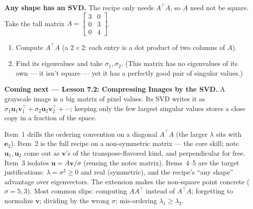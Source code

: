 \documentclass[10pt]{article}
\newcommand{\uu}{\mathbf{u}}
\newcommand{\vv}{\mathbf{v}}
\newcommand{\ee}{\mathbf{e}}
\newcommand{\T}{^{\top}}
\begin{document}
\begin{extensionbox}
\textbf{Any shape has an SVD.} The recipe only needs $A\T A$, so $A$ need not be square. Take the tall
matrix $A=\begin{bmatrix} 3 & 0 \\ 0 & 3 \\ 0 & 4 \end{bmatrix}$.
\begin{enumerate}[label=(\alph*), leftmargin=1.8em, itemsep=5pt]
  \item Compute $A\T A$ (a $2\times2$: each entry is a dot product of two columns of $A$).
  \item Find its eigenvalues and take $\sigma_1,\sigma_2$. (This matrix has no eigenvalues of its own ---
        it isn't square --- yet it has a perfectly good pair of singular values.)
\end{enumerate}
\ansline{(a) Columns $\begin{bsmallmatrix} 3\\0\\0 \end{bsmallmatrix},\begin{bsmallmatrix} 0\\3\\4 \end{bsmallmatrix}$: $A\T A=\begin{bsmallmatrix} 9 & 0\\ 0 & 25 \end{bsmallmatrix}$.}
\end{extensionbox}

\begin{spiralbox}
\textbf{Coming next --- Lesson 7.2: Compressing Images by the SVD.} A grayscale image is a big matrix of
pixel values. Its SVD writes it as $\sigma_1\uu_1\vv_1\T+\sigma_2\uu_2\vv_2\T+\cdots$; keeping only the
few largest singular values stores a close copy in a fraction of the space.
\end{spiralbox}

\begin{teachernote}
Item~1 drills the ordering convention on a diagonal $A\T A$ (the larger $\lambda$ sits with $\ee_2$).
Item~2 is the full recipe on a non-symmetric matrix --- the core skill; note $\uu_1,\uu_2$ come out as
$\vv$'s of the transpose-flavored kind, and perpendicular for free. Item~3 isolates $\uu=A\vv/\sigma$
(reusing the notes matrix). Items~4--5 are the target justifications: $\lambda=\sigma^2\ge0$ and real
(symmetric), and the recipe's ``any shape'' advantage over eigenvectors. The extension makes the
non-square point concrete ($\sigma=5,3$). Most common slips: computing $AA\T$ instead of $A\T A$;
forgetting to normalize $\vv$; dividing by the wrong $\sigma$; mis-ordering $\lambda_1\ge\lambda_2$.
\end{teachernote}
\end{document}
